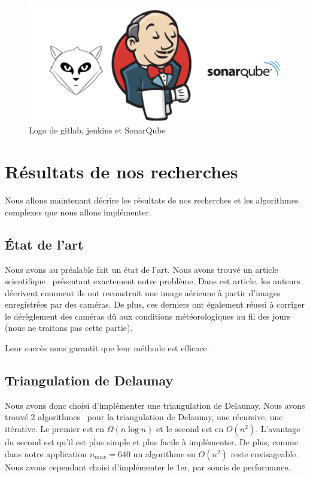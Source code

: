 	\begin{figure}[ht]
	\centering
	\includegraphics[scale=0.5]{contents/img/logos.png}
	\caption{Logo de gitlab, jenkins et SonarQube}
	\end{figure}
			
	\section{Résultats de nos recherches}
		\label{section:recherche}
		
	Nous allons maintenant décrire les résultats de nos recherches et les
	algorithmes complexes que nous allons implémenter.	
			
		\subsection{\'Etat de l'art}
		
	Nous avons au préalable fait un état de l'art. Nous avons trouvé un
	article scientifique~\cite{bernard} présentant exactement notre problème.
	Dans cet article, les  auteurs décrivent comment ils ont reconstruit une
	image aérienne à partir d'images enregistrées par des caméras. De plus,
	ces derniers ont également réussi à corriger le dérèglement des caméras dû
	aux conditions météorologiques au fil des jours (nous ne traitons pas cette
	partie). 
	
	Leur succès nous garantit que leur méthode est efficace.
			
		\subsection{Triangulation de Delaunay}
		
	Nous avons donc choisi d'implémenter une triangulation de Delaunay. Nous 
	avons trouvé 2 algorithmes~\cite{delaunay} pour la triangulation de
	Delaunay, une récursive, une itérative. Le premier est en
	$\Omega(n\log n)$ et le second est en $O(n^2)$. L'avantage du second est
	qu'il est plus simple et plus facile à implémenter. De plus, comme
	dans notre application $n_{max} = 640$ un algorithme en $O(n^2)$ reste
	envisageable. Nous avons cependant choisi d'implémenter le 1er, par soucis
	de performance.
	
